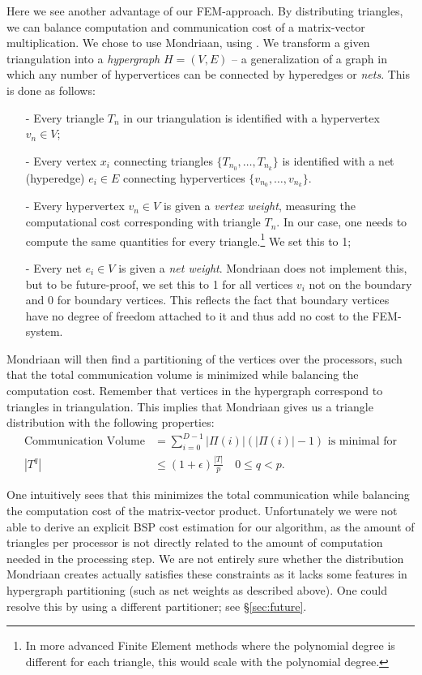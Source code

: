 \documentclass[11pt]{amsart}
\theoremstyle{definition}
\begin{document}
Here we see another advantage of our FEM-approach. By distributing triangles, we can balance computation and communication cost of a matrix-vector multiplication. We chose to use Mondriaan, using \cite{bissmondriaan,biss2012}. We transform a given triangulation into a \emph{hypergraph} $H = (V,E)$ -- a generalization of a graph in which any number of hypervertices can be connected by hyperedges or \emph{nets}. This is done as follows:
\begin{itemize}
  \item[-] Every triangle $T_n$ in our triangulation is identified with a hypervertex $v_n \in V$;
	\item[-] Every vertex $x_i$ connecting triangles $\{T_{n_0}, \ldots, T_{n_k}\}$ is identified with a net (hyperedge) $e_i \in E$ connecting hypervertices $\{v_{n_0}, \ldots, v_{n_k}\}$.
  \item[-] Every hypervertex $v_n \in V$ is given a \emph{vertex weight}, measuring the computational cost corresponding with triangle $T_n$. In our case, one needs to compute the same quantities for every triangle.\footnote{In more advanced Finite Element methods where the polynomial degree is different for each triangle, this would scale with the polynomial degree.} We set this to 1;
  \item[-] Every net $e_i\in V$ is given a \emph{net weight}. Mondriaan does not implement this, but to be future-proof, we set this to 1 for all vertices $v_i$ not on the boundary and 0 for boundary vertices. This reflects the fact that boundary vertices have no degree of freedom attached to it and thus add no cost to the FEM-system.
\end{itemize}
Mondriaan will then find a partitioning of the vertices over the processors, such that the total communication volume is minimized while balancing the computation cost. Remember that vertices in the hypergraph correspond to triangles in triangulation. This implies that Mondriaan gives us a triangle distribution with the following properties:
\begin{align*}
  \text{Communication Volume}&= \sum_{i=0}^{D-1} |\Pi(i)| (|\Pi(i)| -1 ) \text{ is minimal for}\\
	|T^q| & \leq (1 + \epsilon) \frac{|T|}{p} \quad 0 \leq q < p.
\end{align*}

One intuitively sees that this minimizes the total communication while balancing the computation cost of the matrix-vector product. Unfortunately we were not able to derive an explicit BSP cost estimation for our algorithm, as the amount of triangles per processor is not directly related to the amount of computation needed in the processing step. We are not entirely sure whether the distribution Mondriaan creates actually satisfies these constraints as it lacks some features in hypergraph partitioning (such as net weights as described above). One could resolve this by using a different partitioner; see \S\ref{sec:future}.
\end{document}

